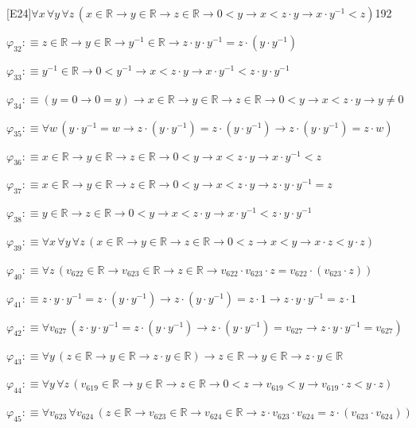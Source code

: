 \begin{fullproof}{[E24]}{$\forall x\,\forall y\,\forall z\,(x \in \mathbb{R} \to y \in \mathbb{R} \to z \in \mathbb{R} \to 0 < y \to x < z \cdot y \to x \cdot y^{-1} < z)$}{192}
\begin{abbrevlist}
\item $\varphi_{32} :\equiv z \in \mathbb{R} \to y \in \mathbb{R} \to y^{-1} \in \mathbb{R} \to z \cdot y \cdot y^{-1} = z \cdot (y \cdot y^{-1})$
\item $\varphi_{33} :\equiv y^{-1} \in \mathbb{R} \to 0 < y^{-1} \to x < z \cdot y \to x \cdot y^{-1} < z \cdot y \cdot y^{-1}$
\item $\varphi_{34} :\equiv (y = 0 \to 0 = y) \to x \in \mathbb{R} \to y \in \mathbb{R} \to z \in \mathbb{R} \to 0 < y \to x < z \cdot y \to y \neq 0$
\item $\varphi_{35} :\equiv \forall w\,(y \cdot y^{-1} = w \to z \cdot (y \cdot y^{-1}) = z \cdot (y \cdot y^{-1}) \to z \cdot (y \cdot y^{-1}) = z \cdot w)$
\item $\varphi_{36} :\equiv x \in \mathbb{R} \to y \in \mathbb{R} \to z \in \mathbb{R} \to 0 < y \to x < z \cdot y \to x \cdot y^{-1} < z$
\item $\varphi_{37} :\equiv x \in \mathbb{R} \to y \in \mathbb{R} \to z \in \mathbb{R} \to 0 < y \to x < z \cdot y \to z \cdot y \cdot y^{-1} = z$
\item $\varphi_{38} :\equiv y \in \mathbb{R} \to z \in \mathbb{R} \to 0 < y \to x < z \cdot y \to x \cdot y^{-1} < z \cdot y \cdot y^{-1}$
\item $\varphi_{39} :\equiv \forall x\,\forall y\,\forall z\,(x \in \mathbb{R} \to y \in \mathbb{R} \to z \in \mathbb{R} \to 0 < z \to x < y \to x \cdot z < y \cdot z)$
\item $\varphi_{40} :\equiv \forall z\,(v_{622} \in \mathbb{R} \to v_{623} \in \mathbb{R} \to z \in \mathbb{R} \to v_{622} \cdot v_{623} \cdot z = v_{622} \cdot (v_{623} \cdot z))$
\item $\varphi_{41} :\equiv z \cdot y \cdot y^{-1} = z \cdot (y \cdot y^{-1}) \to z \cdot (y \cdot y^{-1}) = z \cdot 1 \to z \cdot y \cdot y^{-1} = z \cdot 1$
\item $\varphi_{42} :\equiv \forall v_{627}\,(z \cdot y \cdot y^{-1} = z \cdot (y \cdot y^{-1}) \to z \cdot (y \cdot y^{-1}) = v_{627} \to z \cdot y \cdot y^{-1} = v_{627})$
\item $\varphi_{43} :\equiv \forall y\,(z \in \mathbb{R} \to y \in \mathbb{R} \to z \cdot y \in \mathbb{R}) \to z \in \mathbb{R} \to y \in \mathbb{R} \to z \cdot y \in \mathbb{R}$
\item $\varphi_{44} :\equiv \forall y\,\forall z\,(v_{619} \in \mathbb{R} \to y \in \mathbb{R} \to z \in \mathbb{R} \to 0 < z \to v_{619} < y \to v_{619} \cdot z < y \cdot z)$
\item $\varphi_{45} :\equiv \forall v_{623}\,\forall v_{624}\,(z \in \mathbb{R} \to v_{623} \in \mathbb{R} \to v_{624} \in \mathbb{R} \to z \cdot v_{623} \cdot v_{624} = z \cdot (v_{623} \cdot v_{624}))$

\end{abbrevlist}
\end{fullproof}
